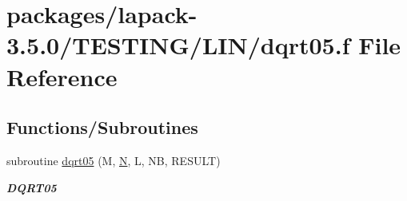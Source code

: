 \hypertarget{dqrt05_8f}{}\section{packages/lapack-\/3.5.0/\+T\+E\+S\+T\+I\+N\+G/\+L\+I\+N/dqrt05.f File Reference}
\label{dqrt05_8f}
\subsection*{Functions/\+Subroutines}
\begin{DoxyCompactItemize}
\item 
subroutine \hyperlink{group__double__lin_ga05f7e3ae4a13016feb188b80d64b9549}{dqrt05} (M, \hyperlink{polmisc_8c_a0240ac851181b84ac374872dc5434ee4}{N}, L, N\+B, R\+E\+S\+U\+L\+T)
\begin{DoxyCompactList}\small\item\em {\bfseries D\+Q\+R\+T05} \end{DoxyCompactList}\end{DoxyCompactItemize}
